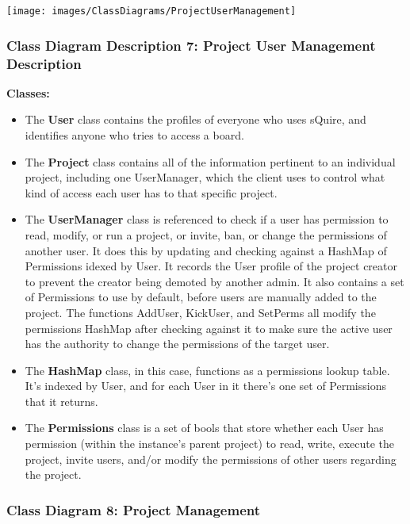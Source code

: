 \documentclass[twoside,letterpaper]{article}
\begin{document}
{\texttt{[image: images/ClassDiagrams/ProjectUserManagement]}

\newpage

\subsubsection[Class Diagram Description 7: Project User Management Description]{\rmfamily\bfseries\color{black}
	Class Diagram Description 7: Project User Management Description}
\hypertarget{RefHeading22059017292}{}

\textbf{Classes:}
\begin{itemize}

	\item The \textbf{User} class contains the profiles of everyone who uses sQuire, and identifies anyone who tries to access a board.
	\item The \textbf{Project} class contains all of the information pertinent to an individual project, including one UserManager, which the client uses to control what kind of access each user has to that specific project.
	\item The \textbf{UserManager} class is referenced to check if a user has permission to read, modify, or run a project, or invite, ban, or change the permissions of another user. It does this by updating and checking against a HashMap of Permissions idexed by User. It records the User profile of the project creator to prevent the creator being demoted by another admin. It also contains a set of Permissions to use by default, before users are manually added to the project.
	The functions AddUser, KickUser, and SetPerms all modify the permissions HashMap after checking against it to make sure the active user has the authority to change the permissions of the target user.
	\item The \textbf{HashMap} class, in this case, functions as a permissions lookup table. It's indexed by User, and for each User in it there's one set of Permissions that it returns.
	\item The \textbf{Permissions} class is a set of bools that store whether each User has permission (within the instance's parent project) to read, write, execute the project, invite users, and/or modify the permissions of other users regarding the project.
\end{itemize}

\newpage

\subsubsection[Class Diagram 8: Project Management]{\rmfamily\bfseries\color{black}
	Class Diagram 8: Project Management}
\hypertarget{RefHeading22059017292}{}
\bigskip

}
\end{document}
